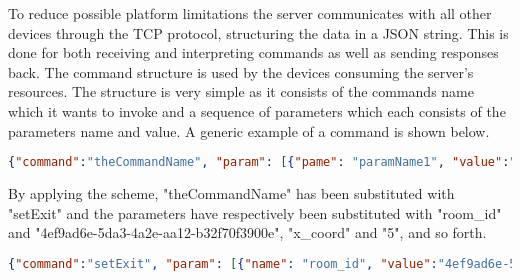 To reduce possible platform limitations the server communicates with all other devices through the TCP protocol, structuring the data in a JSON string. This is done for both receiving and interpreting commands as well as sending responses back.
The command structure is used by the devices consuming the server's resources. The structure is very simple as it consists of the commands name which it wants to invoke and a sequence of parameters which each consists of the parameters name and value.
A generic example of a command is shown below. 
\begin{center}
	\begin{lstlisting}[language=json]
	{"command":"theCommandName", "param": [{"pame": "paramName1", "value":"paramValue1"}, {"name": "paramName2", "value":"paramValue2"}, {"name": "paramName3", "value":"paramValue3"}, {"name": "paramName4", "value":"paramValue4"}]}
	\end{lstlisting}
\end{center}
By applying the scheme, "theCommandName" has been substituted with "setExit" and the parameters have respectively been substituted with "room\_id" and "4ef9ad6e-5da3-4a2e-aa12-b32f70f3900e", "x\_coord" and "5", and so forth. 

\begin{center}
	\begin{lstlisting}[language=json,firstnumber=1]
	{"command":"setExit", "param": [{"name": "room_id", "value":"4ef9ad6e-5da3-4a2e-aa12-b32f70f3900e"}, {"name": "x_coord", "value":"5"}, {"name": "y_coord", "value":"470"}, {"name": "is_exit", "value":"true"}]}
	\end{lstlisting}
\end{center}

